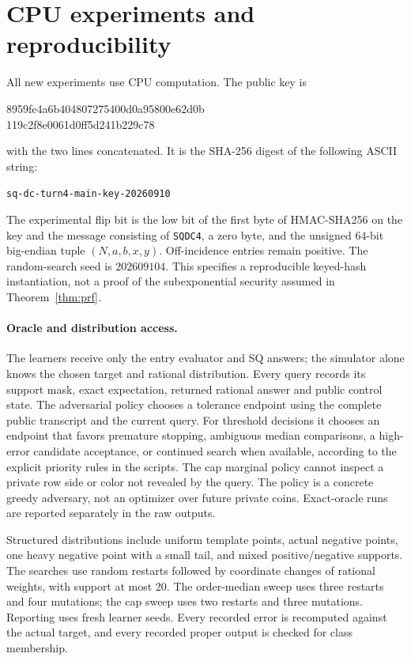 \documentclass[11pt]{article}
\newcommand{\1}{\mathbf 1}
\begin{document}
\section{CPU experiments and reproducibility}\label{app:experiments}
All new experiments use CPU computation. The public key is
\begin{center}\small\ttfamily
8959fe4a6b404807275400d0a95800e62d0b\\
119c2f8e0061d0ff5d241b229c78
\end{center}
with the two lines concatenated. It is the SHA-256 digest of the following ASCII string:\begin{center}\small\texttt{sq-dc-turn4-main-key-20260910}\end{center} The experimental flip bit is the low bit of the first byte of HMAC-SHA256 on the key and the message consisting of \texttt{SQDC4}, a zero byte, and the unsigned 64-bit big-endian tuple $(N,a,b,x,y)$. Off-incidence entries remain positive. The random-search seed is $202609104$. This specifies a reproducible keyed-hash instantiation, not a proof of the subexponential security assumed in Theorem~\ref{thm:prf}.

\paragraph{Oracle and distribution access.}
The learners receive only the entry evaluator and SQ answers; the simulator alone knows the chosen target and rational distribution. Every query records its support mask, exact expectation, returned rational answer and public control state. The adversarial policy chooses a tolerance endpoint using the complete public transcript and the current query. For threshold decisions it chooses an endpoint that favors premature stopping, ambiguous median comparisons, a high-error candidate acceptance, or continued search when available, according to the explicit priority rules in the scripts. The cap marginal policy cannot inspect a private row side or color not revealed by the query. The policy is a concrete greedy adversary, not an optimizer over future private coins. Exact-oracle runs are reported separately in the raw outputs.

Structured distributions include uniform template points, actual negative points, one heavy negative point with a small tail, and mixed positive/negative supports. The searches use random restarts followed by coordinate changes of rational weights, with support at most 20. The order-median sweep uses three restarts and four mutations; the cap sweep uses two restarts and three mutations. Reporting uses fresh learner seeds. Every recorded error is recomputed against the actual target, and every recorded proper output is checked for class membership.
\end{document}
